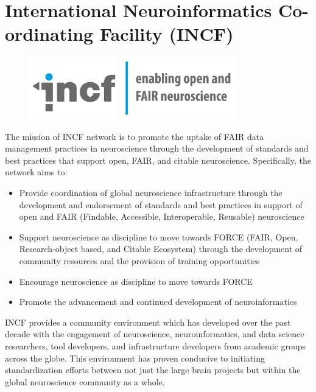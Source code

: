\section*{International Neuroinformatics Co-ordinating Facility (INCF)}%

\begin{figure}[!h]
  \centering
  \includegraphics[width=0.8\textwidth]{images/INCF}
\end{figure}

The mission of INCF network is to promote the uptake of FAIR data management practices in neuroscience through the development of standards and best practices that support open, FAIR, and citable neuroscience.
Specifically, the network aims to:

\begin{itemize}
  \item Provide coordination of global neuroscience infrastructure through the development and endorsement of standards and best practices in support of open and FAIR (Findable, Accessible, Interoperable, Reusable) neuroscience
  \item Support neuroscience as discipline to move towards FORCE (FAIR, Open, Research-object based, and Citable Ecosystem) through the development of community resources and the provision of training opportunities
  \item Encourage neuroscience as discipline to move towards FORCE
  \item Promote the advancement and continued development of neuroinformatics
\end{itemize}

INCF provides a community environment which has developed over the past decade with the engagement of neuroscience, neuroinformatics, and data science researchers, tool developers, and infrastructure developers from academic groups across the globe.
This environment has proven conducive to initiating standardization efforts between not just the large brain projects but within the global neuroscience community as a whole.

